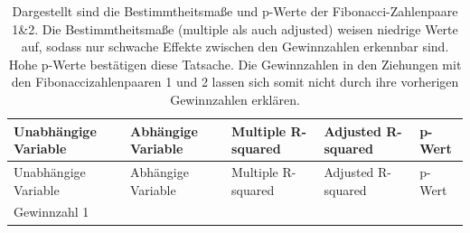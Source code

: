 \documentclass[ngerman,]{article}
\begin{document}
\begin{longtable}[]{@{}lllll@{}}
\caption{Dargestellt sind die Bestimmtheitsmaße und p-Werte der
Fibonacci-Zahlenpaare 1\&2. Die Bestimmtheitsmaße (multiple als auch
adjusted) weisen niedrige Werte auf, sodass nur schwache Effekte
zwischen den Gewinnzahlen erkennbar sind. Hohe p-Werte bestätigen diese
Tatsache. Die Gewinnzahlen in den Ziehungen mit den
Fibonaccizahlenpaaren 1 und 2 lassen sich somit nicht durch ihre
vorherigen Gewinnzahlen erklären.}\tabularnewline
\toprule
\begin{minipage}[b]{0.23\columnwidth}\raggedright\strut
Unabhängige Variable\strut
\end{minipage} & \begin{minipage}[b]{0.19\columnwidth}\raggedright\strut
Abhängige Variable\strut
\end{minipage} & \begin{minipage}[b]{0.19\columnwidth}\raggedright\strut
Multiple R-squared\strut
\end{minipage} & \begin{minipage}[b]{0.19\columnwidth}\raggedright\strut
Adjusted R-squared\strut
\end{minipage} & \begin{minipage}[b]{0.07\columnwidth}\raggedright\strut
p-Wert\strut
\end{minipage}\tabularnewline
\midrule
\endfirsthead
\toprule
\begin{minipage}[b]{0.23\columnwidth}\raggedright\strut
Unabhängige Variable\strut
\end{minipage} & \begin{minipage}[b]{0.19\columnwidth}\raggedright\strut
Abhängige Variable\strut
\end{minipage} & \begin{minipage}[b]{0.19\columnwidth}\raggedright\strut
Multiple R-squared\strut
\end{minipage} & \begin{minipage}[b]{0.19\columnwidth}\raggedright\strut
Adjusted R-squared\strut
\end{minipage} & \begin{minipage}[b]{0.07\columnwidth}\raggedright\strut
p-Wert\strut
\end{minipage}\tabularnewline
\midrule
\endhead
\begin{minipage}[t]{0.23\columnwidth}\raggedright\strut
Gewinnzahl 1\strut
\end{minipage} & \begin{minipage}[t]{0.19\columnwidth}\raggedright\strut

\end{minipage}
\end{longtable}
\end{document}
